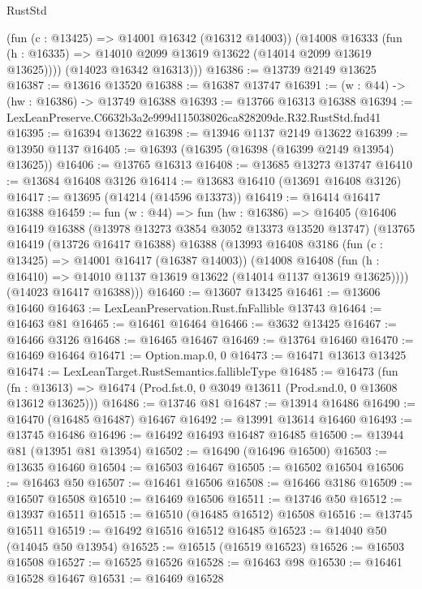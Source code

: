\begin{lexlean}{RustStd}
\begin{coremodule}
          (fun (c : @13425) => @14001 @16342 (@16312 @14003))
          (@14008
            @16333
            (fun (h : @16335) => @14010 @2099 @13619 @13622 (@14014 @2099 @13619 @13625))))
        (@14023 @16342 @16313)))
@16386 := @13739 @2149 @13625
@16387 := @13616 @13520
@16388 := @16387 @13747
@16391 := (w : @44) -> (hw : @16386) -> @13749 @16388
@16393 := @13766 @16313 @16388
@16394 := LexLeanPreserve.C6632b3a2e999d115038026ca828209de.R32.RustStd.fnd41
@16395 := @16394 @13622
@16398 := @13946 @1137 @2149 @13622
@16399 := @13950 @1137
@16405 := @16393 (@16395 (@16398 (@16399 @2149 @13954) @13625))
@16406 := @13765 @16313
@16408 := @13685 @13273 @13747
@16410 := @13684 @16408 @3126
@16414 := @13683 @16410 (@13691 @16408 @3126)
@16417 := @13695 (@14214 (@14596 @13373))
@16419 := @16414 @16417 @16388
@16459 := fun (w : @44) =>
  fun (hw : @16386) =>
  @16405
    (@16406
      @16419
      @16388
      (@13978 @13273 @3854 @3052 @13373 @13520 @13747)
      (@13765
        @16419
        (@13726 @16417 @16388)
        @16388
        (@13993
          @16408
          @3186
          (fun (c : @13425) => @14001 @16417 (@16387 @14003))
          (@14008
            @16408
            (fun (h : @16410) => @14010 @1137 @13619 @13622 (@14014 @1137 @13619 @13625))))
        (@14023 @16417 @16388)))
@16460 := @13607 @13425
@16461 := @13606 @16460
@16463 := LexLeanPreservation.Rust.fnFallible @13743
@16464 := @16463 @81
@16465 := @16461 @16464
@16466 := @3632 @13425
@16467 := @16466 @3126
@16468 := @16465 @16467
@16469 := @13764 @16460
@16470 := @16469 @16464
@16471 := Option.map.{0, 0}
@16473 := @16471 @13613 @13425
@16474 := LexLeanTarget.RustSemantics.fallibleType
@16485 := @16473
    (fun (fn : @13613) =>
    @16474 (Prod.fst.{0, 0} @3049 @13611 (Prod.snd.{0, 0} @13608 @13612 @13625)))
@16486 := @13746 @81
@16487 := @13914 @16486
@16490 := @16470 (@16485 @16487) @16467
@16492 := @13991 @13614 @16460
@16493 := @13745 @16486
@16496 := @16492 @16493 @16487 @16485
@16500 := @13944 @81 (@13951 @81 @13954)
@16502 := @16490 (@16496 @16500)
@16503 := @13635 @16460
@16504 := @16503 @16467
@16505 := @16502 @16504
@16506 := @16463 @50
@16507 := @16461 @16506
@16508 := @16466 @3186
@16509 := @16507 @16508
@16510 := @16469 @16506
@16511 := @13746 @50
@16512 := @13937 @16511
@16515 := @16510 (@16485 @16512) @16508
@16516 := @13745 @16511
@16519 := @16492 @16516 @16512 @16485
@16523 := @14040 @50 (@14045 @50 @13954)
@16525 := @16515 (@16519 @16523)
@16526 := @16503 @16508
@16527 := @16525 @16526
@16528 := @16463 @98
@16530 := @16461 @16528 @16467
@16531 := @16469 @16528

\end{coremodule}
\end{lexlean}
